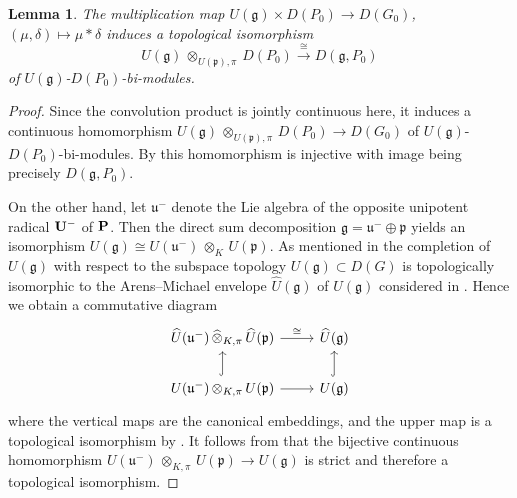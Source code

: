 \documentclass[a4paper, reqno, 10pt]{amsart}
\newtheorem{lemma}[theorem]{Lemma}
\theoremstyle{definition}
\numberwithin{equation}{section}
\newcommand{\botimes}[1]{{\,\otimes_{#1}\,}}
\newcommand{\lra}{\longrightarrow}
\newcommand{\mto}{\mapsto}
\newcommand{\projotimes}{{\,\otimes_{K,\pi}\,}}
\newcommand{\projcotimes}{{\,\widehat{\otimes}_{K,\pi}\,}}
\newcommand{\ra}{\rightarrow}
\newcommand{\bP}{{\mathrm{\bf P}}}
\newcommand{\bU}{{\mathrm{\bf U}}}
\newcommand{\Fg}{{\mathfrak {g}}}
\newcommand{\Fp}{{\mathfrak {p}}}
\newcommand{\Fu}{{\mathfrak {u}}}
\begin{document}
\begin{lemma}\label{Lemma 3 - Description of tensor product of Lie algebra and distribution algebra of subgroup}
	The multiplication map $U(\Fg) \times D(P_0) \ra D(G_0)$, $(\mu,\delta)\mto \mu\ast\delta$ induces a topological isomorphism
	\begin{equation*}
		U(\Fg) \botimes{U(\Fp),\pi} D(P_0) \overset{\cong}{\lra} D(\Fg,P_0)
	\end{equation*} 
	of $U(\Fg)$-$D(P_0)$-bi-modules.
\end{lemma}
\begin{proof}
	Since the convolution product is jointly continuous here, it induces a continuous homomorphism $U(\Fg) \botimes{U(\Fp),\pi} D(P_0) \ra D(G_0)$ of $U(\Fg)$-$D(P_0)$-bi-modules.
	By \cite[Lemma 4.1]{SchmidtStrauch16DimLocAnRep} this homomorphism is injective with image being precisely $D(\Fg,P_0)$.
	
	
	On the other hand, let $\Fu^-$ denote the Lie algebra of the opposite unipotent radical $\bU^-$ of $\bP$.
	Then the direct sum decomposition $\Fg = \Fu^- \oplus \Fp$ yields an isomorphism $U(\Fg) \cong U(\Fu^-) \botimes{K} U(\Fp)$.
	As mentioned in  the completion of $U(\Fg)$ with respect to the subspace topology $U(\Fg)\subset D(G)$ is topologically isomorphic to the Arens--Michael envelope $\widehat{U}(\Fg)$ of $U(\Fg)$ considered in \cite[\S 3.2]{Schmidt13VermModArensMichaelEnv}.
	Hence we obtain a commutative diagram
	\begin{equation*}
		\begin{tikzcd}
			\widehat{U}(\Fu^-) \projcotimes \widehat{U}(\Fp) \ar[r, "\cong"] & \widehat{U}(\Fg) \\
			U(\Fu^-) \projotimes U(\Fp) \ar[r] \ar[u, hookrightarrow] & U(\Fg) \ar[u, hookrightarrow]
		\end{tikzcd}
	\end{equation*}
	where the vertical maps are the canonical embeddings, and the upper map is a topological isomorphism by \cite[Lemma 3.2.4]{Schmidt13VermModArensMichaelEnv}.
	It follows from \cite[Lemma 2]{KopylovKuzminov00KerCokerSeqSemiAbCat} that the bijective continuous homomorphism $U(\Fu^-) \projotimes U(\Fp) \ra U(\Fg)$ is strict and therefore a topological isomorphism.
	

\end{proof}
\end{document}
